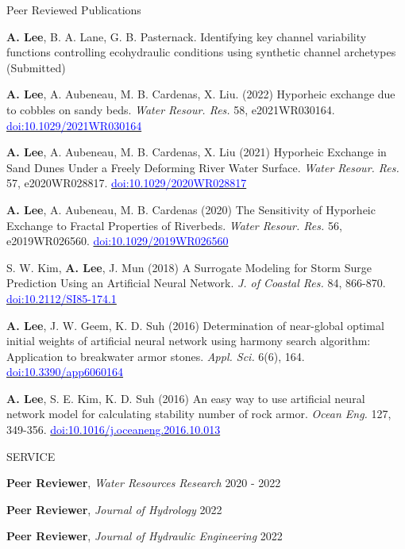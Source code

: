 \documentclass{resume_anzy} %
\begin{document}
\begin{rSection}{Peer Reviewed Publications}
\vspace{-2.5mm}
\item \textbf{A. Lee}, B. A. Lane, G. B. Pasternack. Identifying key channel variability functions controlling ecohydraulic conditions using synthetic channel archetypes (Submitted)
\item \textbf{A. Lee}, A. Aubeneau, M. B. Cardenas, X. Liu. (2022) Hyporheic exchange due to cobbles on sandy beds. \textit{Water Resour. Res.} 58, e2021WR030164. \href{https://doi.org/10.1029/2021WR030164}{\textcolor{blue}{doi:10.1029/2021WR030164}}
\item \textbf{A. Lee}, A. Aubeneau, M. B. Cardenas, X. Liu (2021) Hyporheic Exchange in Sand Dunes Under a Freely Deforming River Water Surface. \textit{Water Resour. Res.} 57, e2020WR028817. \href{https://doi.org/10.1029/2020WR028817}{\textcolor{blue}{doi:10.1029/2020WR028817}}
\item \textbf{A. Lee}, A. Aubeneau, M. B. Cardenas (2020) The Sensitivity of Hyporheic Exchange to Fractal Properties of Riverbeds. \textit{Water Resour. Res.} 56, e2019WR026560. \href{https://doi.org/10.1029/2019WR026560}{\textcolor{blue}{doi:10.1029/2019WR026560}}
\item S. W. Kim, \textbf{A. Lee}, J. Mun (2018) A Surrogate Modeling for Storm Surge Prediction Using an Artificial Neural Network. \textit{J. of Coastal Res.} 84, 866-870. \href{https://doi.org/10.2112/SI85-174.1}{\textcolor{blue}{doi:10.2112/SI85-174.1}}
\item \textbf{A. Lee}, J. W. Geem, K. D. Suh (2016) Determination of near-global optimal initial weights of artificial neural network using harmony search algorithm: Application to breakwater armor stones. \textit{Appl. Sci.} 6(6), 164. \href{https://doi.org/10.3390/app6060164}{\textcolor{blue}{doi:10.3390/app6060164}}
\item \textbf{A. Lee}, S. E. Kim, K. D. Suh (2016) An easy way to use artificial neural network model for calculating stability number of rock armor. \textit{Ocean Eng.} 127, 349-356.  \href{https://doi.org/10.1016/j.oceaneng.2016.10.013}{\textcolor{blue}{doi:10.1016/j.oceaneng.2016.10.013}}
\end{rSection}

\begin{rSection}{SERVICE}
\vspace{-2.5mm}
\item \textbf{Peer Reviewer}, \textit{Water Resources Research} \hfill{2020 - 2022}
\item \textbf{Peer Reviewer}, \textit{Journal of Hydrology} \hfill{2022}
\item \textbf{Peer Reviewer}, \textit{Journal of Hydraulic Engineering} \hfill{2022}

\end{rSection}
\end{document}
